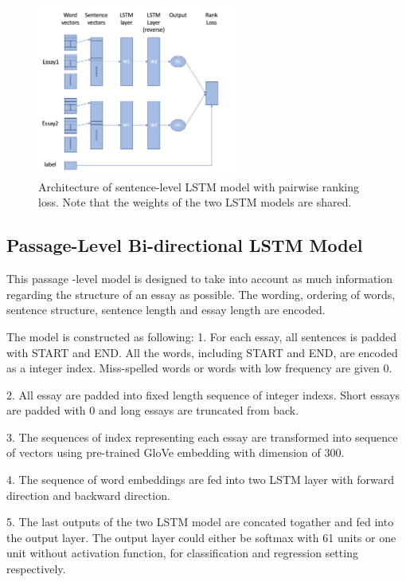 \documentclass[10pt,psamsfonts]{amsart}
\theoremstyle{definition}
\theoremstyle{remark}
\numberwithin{equation}{section}
\begin{document}
\begin{figure}
	\includegraphics[width=0.6\textwidth]{rankmodel.jpg}
	\caption{Architecture of sentence-level LSTM model with pairwise ranking loss. Note that the weights of the two LSTM models are shared.}
	\label{fig:rankmodel}
\end{figure}

\subsection*{Passage-Level Bi-directional LSTM Model}

This passage -level model is designed to take into account as much information regarding the structure of an essay as possible. The wording, ordering of words, sentence structure, sentence length and essay length are encoded. 

The model is constructed as following:
1. For each essay, all sentences is padded with START and END. All the words, including START and END, are encoded as a integer index. Miss-spelled words or words with low frequency are given 0.

2. All essay are padded into fixed length sequence of integer indexs. Short essays are padded with 0 and long essays are truncated from back.

3. The sequences of index representing each essay are transformed into sequence of vectors using pre-trained GloVe embedding with dimension of 300.

4. The sequence of word embeddings are fed into two LSTM layer with forward direction and backward direction.

5. The last outputs of the two LSTM model are concated togather and fed into the output layer. The output layer could either be softmax with 61 units or one unit without activation function, for classification and regression setting respectively.
\end{document}
